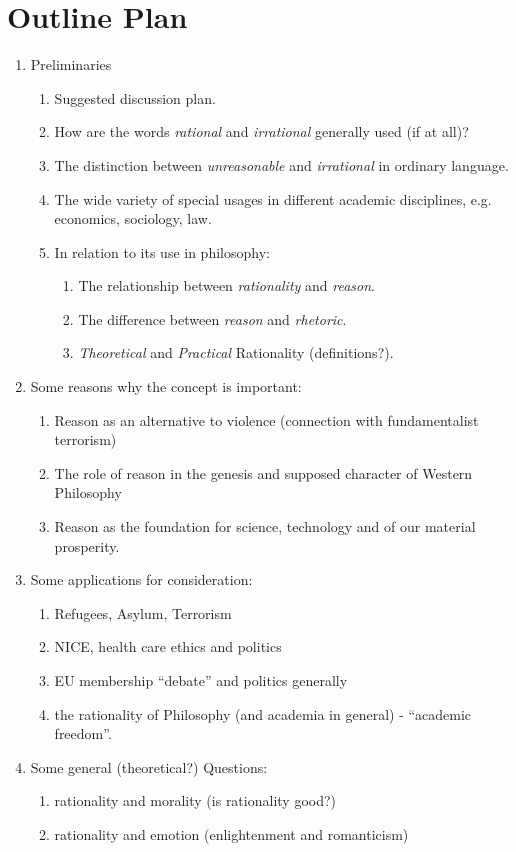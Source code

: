 \documentclass[14pt,titlepage]{extarticle}
\begin{document}
\pagebreak

\section{Outline Plan}

\begin{enumerate}
\item Preliminaries
\begin{enumerate}
\item Suggested discussion plan.
\item How are the words {\it rational} and {\it irrational} generally used (if at all)?
\item The distinction between {\it unreasonable} and {\it irrational} in ordinary language.
\item The wide variety of special usages in different academic disciplines, e.g. economics, sociology, law.
\item In relation to its use in philosophy:
\begin{enumerate}
\item The relationship between {\it rationality} and {\it reason}.
\item The difference between {\it reason} and {\it rhetoric}.
\item {\it Theoretical} and {\it Practical} Rationality (definitions?).
\end{enumerate}
\end{enumerate}
\item Some reasons why the concept is important:
\begin{enumerate}
\item Reason as an alternative to violence (connection with fundamentalist terrorism)
\item The role of reason in the genesis and supposed character of Western Philosophy
\item Reason as the foundation for science, technology and of our material prosperity.
\end{enumerate}
\item Some applications for consideration:
\begin{enumerate}
\item Refugees, Asylum, Terrorism
\item NICE, health care ethics and politics
\item EU membership ``debate'' and politics generally
\item the rationality of Philosophy (and academia in general) - ``academic freedom''.
\end{enumerate}
\item Some general (theoretical?) Questions:
\begin{enumerate}
\item rationality and morality (is rationality good?)
\item rationality and emotion (enlightenment and romanticism)
\end{enumerate}
\end{enumerate}
\end{document}
